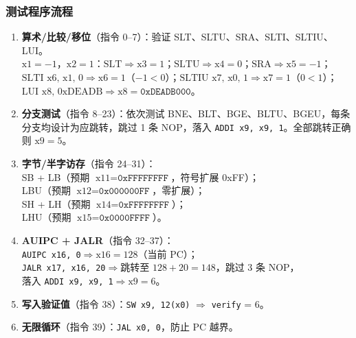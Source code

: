 \documentclass[12pt,hyperref,a4paper,UTF8]{ctexart}
\begin{document}
\subsubsection{测试程序流程}

\begin{enumerate}[leftmargin=2em]
    \item \textbf{算术/比较/移位}（指令 0--7）：验证 SLT、SLTU、SRA、SLTI、SLTIU、LUI。\\
          $\text{x1}=-1$，$\text{x2}=1$：$\text{SLT}\Rightarrow\text{x3}=1$；$\text{SLTU}\Rightarrow\text{x4}=0$；$\text{SRA}\Rightarrow\text{x5}=-1$；\\
          $\text{SLTI x6, x1, 0}\Rightarrow\text{x6}=1$（$-1<0$）；$\text{SLTIU x7, x0, 1}\Rightarrow\text{x7}=1$（$0<1$）；\\
          $\text{LUI x8, 0xDEADB}\Rightarrow\text{x8}=\texttt{0xDEADB000}$。

    \item \textbf{分支测试}（指令 8--23）：依次测试 BNE、BLT、BGE、BLTU、BGEU，每条分支均设计为应跳转，跳过 1 条 NOP，落入 \texttt{ADDI x9, x9, 1}。全部跳转正确则 $\text{x9}=5$。

    \item \textbf{字节/半字访存}（指令 24--31）：\\
          SB + LB（预期 $\text{x11}=\texttt{0xFFFFFFFF}$，符号扩展 0xFF）；\\
          LBU（预期 $\text{x12}=\texttt{0x000000FF}$，零扩展）；\\
          SH + LH（预期 $\text{x14}=\texttt{0xFFFFFFFF}$）；\\
          LHU（预期 $\text{x15}=\texttt{0x0000FFFF}$）。

    \item \textbf{AUIPC + JALR}（指令 32--37）：\\
          \texttt{AUIPC x16, 0}$\Rightarrow\text{x16}=128$（当前 PC）；\\
          \texttt{JALR x17, x16, 20}$\Rightarrow$跳转至 $128+20=148$，跳过 3 条 NOP，\\
          落入 \texttt{ADDI x9, x9, 1}$\Rightarrow\text{x9}=6$。

    \item \textbf{写入验证值}（指令 38）：\texttt{SW x9, 12(x0)} $\Rightarrow$ \texttt{verify} = 6。

    \item \textbf{无限循环}（指令 39）：\texttt{JAL x0, 0}，防止 PC 越界。
\end{enumerate}
\end{document}
